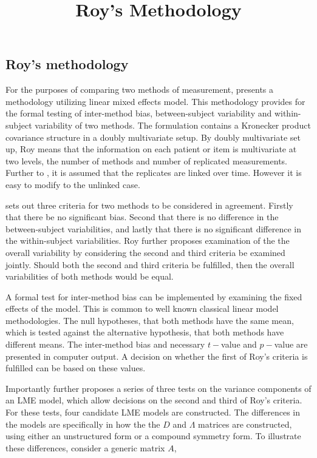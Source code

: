 \documentclass[12pt, a4paper]{article}
\title{Roy's Methodology}
\author{ } \date{ }
\theoremstyle{plain}
\theoremstyle{definition}
\theoremstyle{remark}
\begin{document}
\tableofcontents
\newpage
\subsection{Roy's methodology}

For the purposes of comparing two methods of measurement, \citet{roy} presents a methodology utilizing linear mixed effects model. This methodology provides for the formal testing of inter-method bias, between-subject variability and within-subject variability of two methods. The formulation contains a Kronecker product covariance structure in a doubly multivariate setup. By doubly multivariate set up, Roy means that the information on each patient or item is multivariate at two levels, the number of methods and number of replicated measurements. Further to \citet{lam}, it is assumed that the replicates are linked over time. However it is easy to modify to the unlinked case.

\citet{roy} sets out three criteria for two methods to be considered in agreement. Firstly that there be no significant bias. Second that there is no difference in the between-subject variabilities, and lastly that there is no significant difference in the within-subject variabilities. Roy further proposes examination of the the overall variability by considering the second and third criteria be examined jointly. Should both the second and third criteria be fulfilled, then the overall variabilities of both methods would be equal.

A formal test for inter-method bias can be implemented by examining the fixed effects of the model. This is common to well known classical linear model methodologies. The null hypotheses, that both methods have the same mean, which is tested against the alternative hypothesis, that both methods have different means.
The inter-method bias and necessary $t-$value and $p-$value are presented in computer output. A decision on whether the first of Roy's criteria is fulfilled can be based on these values.

Importantly \citet{roy} further proposes a series of three tests on the variance components of an LME model, which allow decisions on the second and third of Roy's criteria. For these tests, four candidate LME models are constructed. The differences in the models are specifically in how the the $D$ and $\Lambda$ matrices are constructed, using either an unstructured form or a compound symmetry form. To illustrate these differences, consider a generic matrix $A$,
\end{document}
